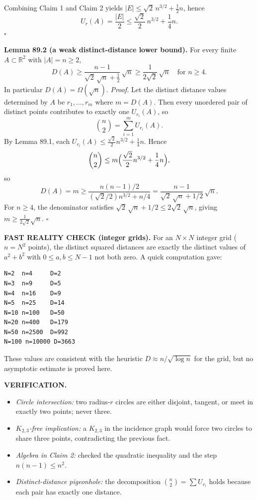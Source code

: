 Combining Claim 1 and Claim 2 yields $|E|\le \sqrt 2\,n^{3/2}+\tfrac12 n$, hence
\[
U_r(A)=\frac{|E|}{2}\le \frac{\sqrt 2}{2}\,n^{3/2}+\frac14 n.
\]
\hfill $\square$

\smallskip
\noindent\textbf{Lemma 89.2 (a weak distinct-distance lower bound).}
For every finite $A\subset\mathbb{R}^2$ with $|A|=n\ge 2$,
\[
D(A)\ge \frac{n-1}{\sqrt 2\,\sqrt n+\tfrac12}\,\sqrt n \ge \frac{1}{2\sqrt 2}\,\sqrt n\quad\text{for }n\ge 4.
\]
In particular $D(A)=\Omega(\sqrt n)$.
\textit{Proof.}
Let the distinct distance values determined by $A$ be $r_1,\dots,r_m$ where $m=D(A)$.
Then every unordered pair of distinct points contributes to exactly one $U_{r_i}(A)$, so
\[
\binom{n}{2} = \sum_{i=1}^m U_{r_i}(A).
\]
By Lemma 89.1, each $U_{r_i}(A)\le \tfrac{\sqrt2}{2}n^{3/2}+\tfrac14 n$. Hence
\[
\binom{n}{2}\le m\Bigl(\frac{\sqrt2}{2}n^{3/2}+\frac14 n\Bigr),
\]
so
\[
D(A)=m\ge \frac{n(n-1)/2}{(\sqrt2/2)n^{3/2}+n/4}
=\frac{n-1}{\sqrt2\,\sqrt n+1/2}\,\sqrt n.
\]
For $n\ge 4$, the denominator satisfies $\sqrt2\,\sqrt n+1/2\le 2\sqrt2\,\sqrt n$, giving $m\ge \tfrac1{2\sqrt2}\sqrt n$.
\hfill $\square$

\smallskip
\noindent\textbf{FAST REALITY CHECK (integer grids).}
For an $N\times N$ integer grid ($n=N^2$ points), the distinct squared distances are exactly the distinct values of $a^2+b^2$ with $0\le a,b\le N-1$ not both zero.
A quick computation gave:
\begin{verbatim}
N=2  n=4     D=2
N=3  n=9     D=5
N=4  n=16    D=9
N=5  n=25    D=14
N=10 n=100   D=50
N=20 n=400   D=179
N=50 n=2500  D=992
N=100 n=10000 D=3663
\end{verbatim}
These values are consistent with the heuristic $D\approx n/\sqrt{\log n}$ for the grid, but no asymptotic estimate is proved here.

\medskip
\noindent\textbf{VERIFICATION.}
\begin{itemize}
\item \emph{Circle intersection:} two radius-$r$ circles are either disjoint, tangent, or meet in exactly two points; never three.
\item \emph{$K_{2,3}$-free implication:} a $K_{2,3}$ in the incidence graph would force two circles to share three points, contradicting the previous fact.
\item \emph{Algebra in Claim 2:} checked the quadratic inequality and the step $n(n-1)\le n^2$.
\item \emph{Distinct-distance pigeonhole:} the decomposition $\binom{n}{2}=\sum U_{r_i}$ holds because each pair has exactly one distance.
\end{itemize}

